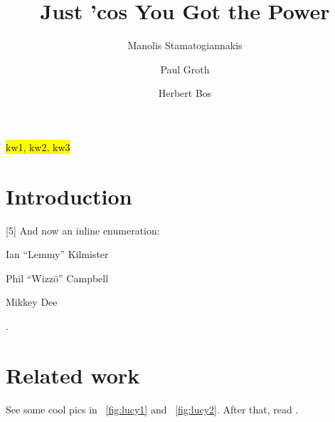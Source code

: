 \documentclass{ieeetran}
\newcommand{\figref}[1]{\figurename~\ref{#1}\xspace}
\newcommand{\hlc}[2][yellow]{ {\sethlcolor{#1} \hl{#2}} }
\begin{document}

\title{Just 'cos You Got the Power}
\author{Manolis Stamatogiannakis \and Paul Groth \and Herbert Bos}

\maketitle


\begin{abstract}
\blindtext
\end{abstract}

\begin{keywords}\hlc{kw1, kw2, kw3}\end{keywords}


\section{Introduction}
\blindtext[1]
[5]
\blindtext[1]
And now an inline enumeration:
\begin{enumerate*}[label=\itshape\alph*\upshape)]
\item Ian ``Lemmy'' Kilmister
\item Phil ``Wizzö'' Campbell
\item Mikkey Dee
\end{enumerate*}.


\section{Related work}

See some cool pics in \figref{fig:lucy1} and \figref{fig:lucy2}.
After that, read \cite{Stamatogiannakis:BlackBox:IPAW:2014}.
\end{document}
